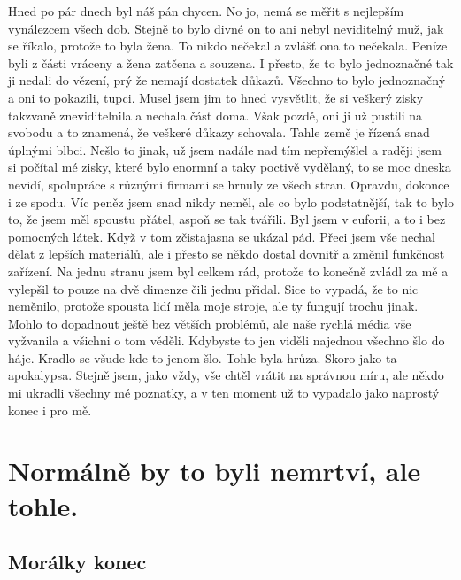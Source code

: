 Hned po pár dnech byl náš pán chycen. No jo, nemá se měřit s nejlepším vynálezcem všech dob. Stejně to bylo divné on to ani nebyl neviditelný muž, jak se říkalo, protože to byla žena. To nikdo nečekal a zvlášť ona to nečekala. Peníze byli z části vráceny a žena zatčena a souzena. I přesto, že to bylo jednoznačné tak ji nedali do vězení, prý že nemají dostatek důkazů. Všechno to bylo jednoznačný a oni to pokazili, tupci. Musel jsem jim to hned vysvětlit, že si veškerý zisky takzvaně zneviditelnila a nechala část doma. Však pozdě, oni ji už pustili na svobodu a to znamená, že veškeré důkazy schovala. Tahle země je řízená snad úplnými blbci. Nešlo to jinak, už jsem nadále nad tím nepřemýšlel a raději jsem si počítal mé zisky, které bylo enormní a taky poctivě vydělaný, to se moc dneska nevidí, spolupráce s různými firmami se hrnuly ze všech stran. Opravdu, dokonce i ze spodu. Víc peněz jsem snad nikdy neměl, ale co bylo podstatnější, tak to bylo to, že jsem měl spoustu přátel, aspoň se tak tvářili. Byl jsem v euforii, a to i bez pomocných látek. Když v tom zčistajasna se ukázal pád. Přeci jsem vše nechal dělat z lepších materiálů, ale i přesto se někdo dostal dovnitř a změnil funkčnost zařízení. Na jednu stranu jsem byl celkem rád, protože to konečně zvládl za mě a vylepšil to pouze na dvě dimenze čili jednu přidal. Sice to vypadá, že to nic neměnilo, protože spousta lidí měla moje stroje, ale ty fungují trochu jinak. Mohlo to dopadnout ještě bez větších problémů, ale naše rychlá média vše vyžvanila a všichni o tom věděli. Kdybyste to jen viděli najednou všechno šlo do háje. Kradlo se všude kde to jenom šlo. Tohle byla hrůza. Skoro jako ta apokalypsa. Stejně jsem, jako vždy, vše chtěl vrátit na správnou míru, ale někdo mi ukradli všechny mé poznatky, a v ten moment už to vypadalo jako naprostý konec i pro mě.

\chapter{Normálně by to byli nemrtví, ale tohle.}

\section{Morálky konec}

